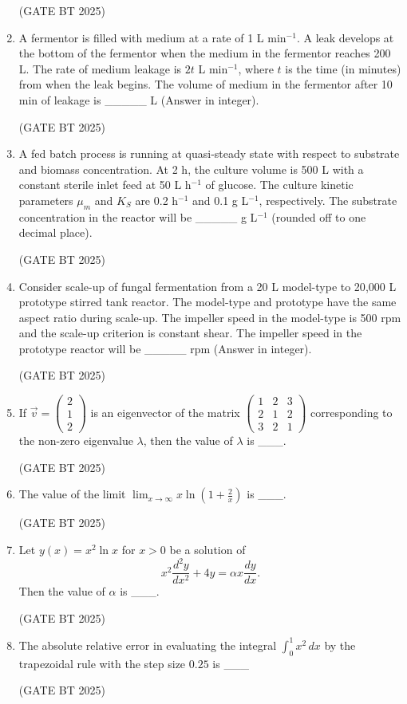 \documentclass[journal,12pt,onecolumn]{IEEEtran}
\theoremstyle{remark}
\begin{document}
\begin{enumerate}
\hfill (GATE BT 2025)

\item A fermentor is filled with medium at a rate of 1 L min$^{-1}$. A leak develops at the bottom of the fermentor when the medium in the fermentor reaches 200 L. The rate of medium leakage is $2t$ L min$^{-1}$, where $t$ is the time (in minutes) from when the leak begins. The volume of medium in the fermentor after 10 min of leakage is \_\_\_\_\_ L (Answer in integer).

\hfill (GATE BT 2025)

\item A fed batch process is running at quasi-steady state with respect to substrate and biomass concentration. At 2 h, the culture volume is 500 L with a constant sterile inlet feed at 50 L h$^{-1}$ of glucose. The culture kinetic parameters $\mu_m$ and $K_S$ are 0.2 h$^{-1}$ and 0.1 g L$^{-1}$, respectively. The substrate concentration in the reactor will be \_\_\_\_\_ g L$^{-1}$ (rounded off to one decimal place).

\hfill (GATE BT 2025)

\item Consider scale-up of fungal fermentation from a 20 L model-type to 20{,}000 L prototype stirred tank reactor. The model-type and prototype have the same aspect ratio during scale-up. The impeller speed in the model-type is 500 rpm and the scale-up criterion is constant shear. The impeller speed in the prototype reactor will be \_\_\_\_\_ rpm (Answer in integer).

\hfill (GATE BT 2025)

\item If $\vec{v}=\begin{pmatrix}2\\[2pt]1\\[2pt]2\end{pmatrix}$ is an eigenvector of the matrix
$\begin{pmatrix}
1 & 2 & 3\\
2 & 1 & 2\\
3 & 2 & 1
\end{pmatrix}$ corresponding to the non-zero eigenvalue $\lambda$, then the value of $\lambda$ is \_\_\_.

\hfill (GATE BT 2025)

\item The value of the limit $\displaystyle \lim_{x\to\infty} x\ln\!\left(1+\frac{2}{x}\right)$ is \_\_\_.

\hfill (GATE BT 2025)

\item Let $y(x)=x^2\ln x$ for $x>0$ be a solution of
\[
x^2\frac{d^2 y}{dx^2}+4y=\alpha x\frac{dy}{dx}.
\]
Then the value of $\alpha$ is \_\_\_.

\hfill (GATE BT 2025)

\item The absolute relative error in evaluating the integral $\displaystyle \int_{0}^{1} x^2\,dx$ by the trapezoidal rule with the step size $0.25$ is \_\_\_%

\hfill (GATE BT 2025)

\end{enumerate}
\end{document}

